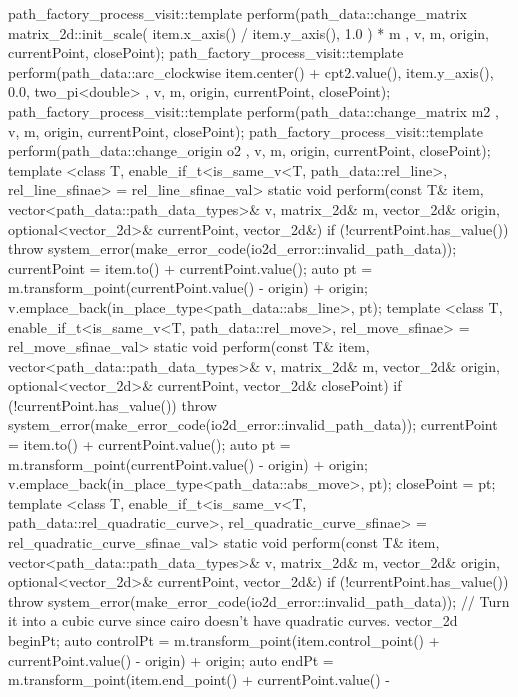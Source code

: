 \begin{codeblock}
{{{        path_factory_process_visit::template perform(path_data::change_matrix{ matrix_2d::init_scale({ item.x_axis() / item.y_axis(), 1.0 }) * m }, v, m, origin, currentPoint, closePoint);
        path_factory_process_visit::template perform(path_data::arc_clockwise{ item.center() + cpt2.value(), item.y_axis(), 0.0, two_pi<double> }, v, m, origin, currentPoint, closePoint);
        path_factory_process_visit::template perform(path_data::change_matrix{ m2 }, v, m, origin, currentPoint, closePoint);
        path_factory_process_visit::template perform(path_data::change_origin{ o2 }, v, m, origin, currentPoint, closePoint);
      }
      template <class T, enable_if_t<is_same_v<T, path_data::rel_line>, rel_line_sfinae> = rel_line_sfinae_val>
      static void perform(const T& item, vector<path_data::path_data_types>& v, matrix_2d& m, vector_2d& origin, optional<vector_2d>& currentPoint, vector_2d&) {
        if (!currentPoint.has_value()) {
          throw system_error(make_error_code(io2d_error::invalid_path_data));
        }
        currentPoint = item.to() + currentPoint.value();
        auto pt = m.transform_point(currentPoint.value() - origin) + origin;
        v.emplace_back(in_place_type<path_data::abs_line>, pt);
      }
      template <class T, enable_if_t<is_same_v<T, path_data::rel_move>, rel_move_sfinae> = rel_move_sfinae_val>
      static void perform(const T& item, vector<path_data::path_data_types>& v, matrix_2d& m, vector_2d& origin, optional<vector_2d>& currentPoint, vector_2d& closePoint) {
        if (!currentPoint.has_value()) {
          throw system_error(make_error_code(io2d_error::invalid_path_data));
        }
        currentPoint = item.to() + currentPoint.value();
        auto pt = m.transform_point(currentPoint.value() - origin) + origin;
        v.emplace_back(in_place_type<path_data::abs_move>, pt);
        closePoint = pt;
      }
      template <class T, enable_if_t<is_same_v<T, path_data::rel_quadratic_curve>, rel_quadratic_curve_sfinae> = rel_quadratic_curve_sfinae_val>
      static void perform(const T& item, vector<path_data::path_data_types>& v, matrix_2d& m, vector_2d& origin, optional<vector_2d>& currentPoint, vector_2d&) {
        if (!currentPoint.has_value()) {
          throw system_error(make_error_code(io2d_error::invalid_path_data));
        }
        // Turn it into a cubic curve since cairo doesn't have quadratic curves.
        vector_2d beginPt;
        auto controlPt = m.transform_point(item.control_point() + currentPoint.value() -
          origin) + origin;
        auto endPt = m.transform_point(item.end_point() + currentPoint.value() -
}}}
\end{codeblock}
